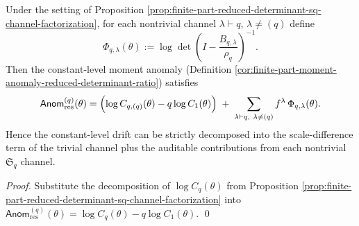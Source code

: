 \begin{corollary}\label{cor:finite-part-moment-anomaly-channel-additivity}
Under the setting of Proposition \ref{prop:finite-part-reduced-determinant-sq-channel-factorization},
for each nontrivial channel \(\lambda\vdash q\), \(\lambda\neq(q)\) define
\[
\Phi_{q,\lambda}(\theta)
:=
\log\det\!\left(I-\frac{B_{q,\lambda}}{\rho_q}\right)^{-1}.
\]
Then the constant-level moment anomaly (Definition \ref{cor:finite-part-moment-anomaly-reduced-determinant-ratio}) satisfies
\[
\mathsf{Anom}^{(q)}_{\mathrm{res}}(\theta)
=
\Bigl(\log C_{q,(q)}(\theta)-q\log C_1(\theta)\Bigr)
\;+\;
\sum_{\lambda\vdash q,\ \lambda\neq(q)} f^\lambda\,\Phi_{q,\lambda}(\theta).
\]
Hence the constant-level drift can be strictly decomposed into the scale-difference term of the trivial channel plus the auditable contributions from each nontrivial \(\mathfrak{S}_q\) channel.
\end{corollary}
\begin{proof}
Substitute the decomposition of \(\log C_q(\theta)\) from Proposition \ref{prop:finite-part-reduced-determinant-sq-channel-factorization} into
\(
\mathsf{Anom}^{(q)}_{\mathrm{res}}(\theta)=\log C_q(\theta)-q\log C_1(\theta)
\). \qed
\end{proof}


